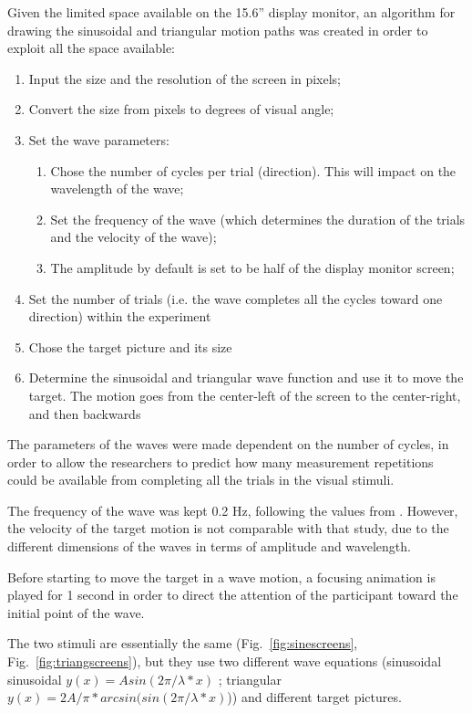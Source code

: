 Given the limited space available on the 15.6” display monitor, an algorithm for drawing the sinusoidal and triangular motion paths was created in order to exploit all the space available:
\begin{enumerate}
    \item Input the size and the resolution of the screen in pixels;
    \item Convert the size from pixels to degrees of visual angle;
    \item Set the wave parameters:
    \begin{enumerate} [label*=\arabic*.]
        \item Chose the number of cycles per trial (direction). This will impact on the wavelength of the wave;
        \item Set the frequency of the wave (which determines the duration of the trials and the velocity of the wave);
        \item The amplitude by default is set to be half of the display monitor screen;
    \end{enumerate}
    \item Set the number of trials (i.e. the wave completes all the cycles toward one direction) within the experiment
    \item Chose the target picture and its size
    \item Determine the sinusoidal and triangular wave function and use it to move the target. The motion goes from the center-left of the screen to the center-right, and then backwards
\end{enumerate}

The parameters of the waves were made dependent on the number of cycles, in order to allow the researchers to predict how many measurement repetitions could be available from completing all the trials in the visual stimuli.

The frequency of the wave was kept 0.2 Hz, following the values from \cite{vonhofsten1997smoothpursuit}. However, the velocity of the target motion is not comparable with that study, due to the different dimensions of the waves in terms of amplitude and wavelength.

Before starting to move the target in a wave motion, a focusing animation is played for 1 second in order to direct the attention of the participant toward the initial point of the wave.

The two stimuli are essentially the same (Fig.~\ref{fig:sinescreens}, Fig.~\ref{fig:triangscreens}), but they use two different wave equations (sinusoidal sinusoidal $y(x)=Asin(2\pi/\lambda*x) $ ; triangular $y(x)=2A/\pi*arcsin(sin(2\pi/\lambda*x)$)) and different target pictures.

